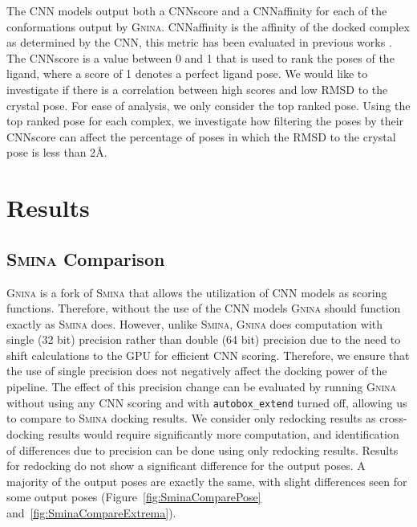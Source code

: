 \documentclass[journal=jcisd8,manuscript=article]{achemso}
\begin{document}
The CNN models output both a CNNscore and a CNNaffinity for each of the conformations output by \textsc{Gnina}. CNNaffinity is the affinity of the docked complex as determined by the CNN, this metric has been evaluated in previous works \cite{francoeur2020three}. The CNNscore is a value between 0 and 1 that is used to rank the poses of the ligand, where a score of 1 denotes a perfect ligand pose. We would like to investigate if there is a correlation between high scores and low RMSD to the crystal pose. For ease of analysis, we only consider the top ranked pose. Using the top ranked pose for each complex, we investigate how filtering the poses by their CNNscore can affect the percentage of poses in which the RMSD to the crystal pose is less than 2{\AA}.

\section{Results}
\subsection{{\normalfont\scshape Smina} Comparison}
\textsc{Gnina} is a fork of \textsc{Smina} that allows the utilization of CNN models as scoring functions. Therefore, without the use of the CNN models \textsc{Gnina} should function exactly as \textsc{Smina} does. However, unlike \textsc{Smina}, \textsc{Gnina} does computation with single (32 bit) precision rather than double (64 bit) precision due to the need to shift calculations to the GPU for efficient CNN scoring. Therefore, we ensure that the use of single precision does not negatively affect the docking power of the pipeline. The effect of this precision change can be evaluated by running \textsc{Gnina} without using any CNN scoring and with \texttt{autobox\_extend} turned off, allowing us to compare to \textsc{Smina} docking results. We consider only redocking results as cross-docking results would require significantly more computation, and identification of differences due to precision can be done using only redocking results. Results for redocking do not show a significant difference for the output poses. A majority of the output poses are exactly the same, with slight differences seen for some output poses (Figure~\ref{fig:SminaComparePose} and~\ref{fig:SminaCompareExtrema}).
\end{document}
